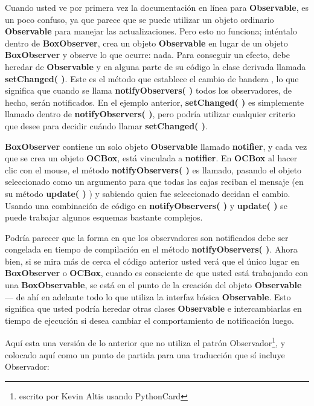 Cuando usted ve por primera vez la documentación en línea para \textbf{Observable}, es un poco confuso, ya que parece que se puede utilizar un objeto ordinario \textbf{Observable} para manejar las actualizaciones. Pero esto no funciona; inténtalo \- dentro de \textbf{BoxObserver}, crea un objeto \textbf{Observable} en lugar de un objeto \textbf{BoxObserver} y observe lo que ocurre: nada. Para conseguir un efecto, debe heredar de \textbf{Observable} y en alguna parte de su código la clase derivada llamada \textbf{setChanged( )}. Este es el método que establece el cambio de bandera , lo que significa que cuando se llama \textbf{notifyObservers( )} todos los observadores, de hecho, serán notificados. En el ejemplo anterior, \textbf{setChanged( )} es simplemente llamado dentro de \textbf{notifyObservers( )}, pero podría utilizar cualquier criterio que desee para decidir cuándo llamar \textbf{setChanged( )}.      \newline

\textbf{BoxObserver} contiene un solo objeto \textbf{Observable} llamado \textbf{notifier}, y cada vez que se crea un objeto \textbf{OCBox}, está vinculada a \textbf{notifier}.  En \textbf{OCBox} al hacer clic con el mouse, el método \textbf{notifyObservers( )} es llamado, pasando el objeto seleccionado como un argumento para que todas las cajas reciban el mensaje (en su método \textbf{update( ) }) y sabiendo quien fue seleccionado decidan el cambio.
Usando una combinación de código en \textbf{notifyObservers( )} y \textbf{update( )} se puede trabajar algunos esquemas bastante complejos.     \newline

Podría parecer que la forma en que los observadores son notificados debe ser congelada en tiempo de compilación en el método \textbf{notifyObservers( )}. Ahora bien, si se mira más de cerca el código anterior usted verá que el único lugar en \textbf{BoxObserver} o \textbf{OCBox}, cuando es consciente de que usted está trabajando con una \textbf{BoxObservable}, se está en el punto de la creación del objeto \textbf{Observable} — de ahí en adelante todo lo que utiliza la interfaz básica \textbf{Observable}. Esto significa que usted podría heredar otras clases \textbf{Observable} e intercambiarlas en tiempo de ejecución si desea cambiar el comportamiento de notificación luego.  \newline

Aquí esta una versión de lo anterior que no utiliza el patrón Observador\footnote{escrito por Kevin Altis usando PythonCard}, y colocado aquí como un punto de partida para una traducción que sí incluye Observador:  \newline

